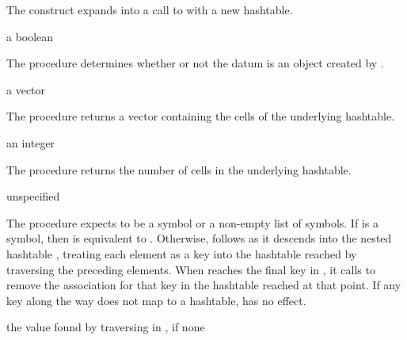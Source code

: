 \begin{syntax}
\end{syntax}

The  construct expands into a call to
 with a new hashtable.

\begin{procedure}
\end{procedure}
\returns{} a boolean

The  procedure determines whether or not the datum
 is an object created by .

\begin{procedure}
\end{procedure}
\returns{} a vector

The  procedure returns a vector containing the
cells of the underlying hashtable.

\begin{procedure}
\end{procedure}
\returns{} an integer

The  procedure returns the number of cells
in the underlying hashtable.

\begin{procedure}
\end{procedure}
\returns{} unspecified

The  procedure expects  to be a symbol or
a non-empty list of symbols.
If  is a symbol, then  is equivalent
to .
Otherwise,  follows  as it descends into
the nested hashtable , treating each element as a key into
the hashtable reached by traversing the preceding elements.
When  reaches the final key in ,
it calls  to remove the association for
that key in the hashtable reached at that point.
If any key along the way does not map to a hashtable,
 has no effect.

\begin{procedure}
\end{procedure}
\returns{} the value found by traversing  in ,
 if none

